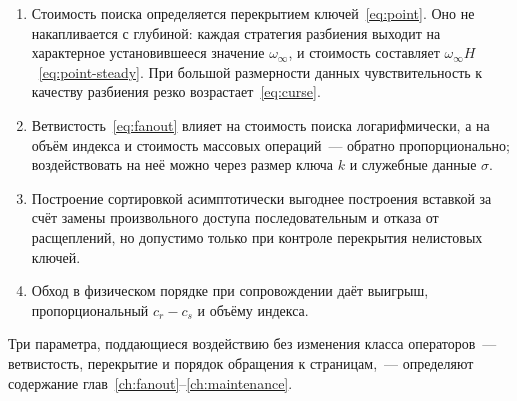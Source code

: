 \begin{enumerate}
\item Стоимость поиска определяется перекрытием ключей~\eqref{eq:point}. Оно не
      накапливается с глубиной: каждая стратегия разбиения выходит на
      характерное установившееся значение $\omega_\infty$, и стоимость
      составляет $\omega_\infty H$~\eqref{eq:point-steady}. При большой
      размерности данных чувствительность к качеству разбиения резко
      возрастает~\eqref{eq:curse}.
\item Ветвистость~\eqref{eq:fanout} влияет на стоимость поиска логарифмически, а
      на объём индекса и стоимость массовых операций~--- обратно
      пропорционально; воздействовать на неё можно через размер ключа $k$ и
      служебные данные $\sigma$.
\item Построение сортировкой асимптотически выгоднее построения вставкой за
      счёт замены произвольного доступа последовательным и отказа от
      расщеплений, но допустимо только при контроле перекрытия нелистовых
      ключей.
\item Обход в физическом порядке при сопровождении даёт выигрыш, пропорциональный
      $c_r-c_s$ и объёму индекса.
\end{enumerate}

Три параметра, поддающиеся воздействию без изменения класса операторов~---
ветвистость, перекрытие и порядок обращения к страницам,~--- определяют
содержание глав~\ref{ch:fanout}--\ref{ch:maintenance}.

